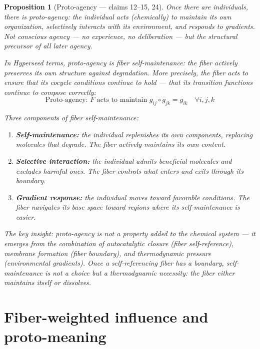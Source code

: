 \documentclass[11pt,a4paper]{article}
\newtheorem{proposition}[definition]{Proposition}
\begin{document}
\begin{proposition}[Proto-agency --- claims 12--15, 24]
\label{prop:maintenance}
Once there are individuals, there is proto-agency: the individual
acts (chemically) to maintain its own organization, selectively
interacts with its environment, and responds to gradients. Not
conscious agency --- no experience, no deliberation --- but the
structural precursor of all later agency.

In Hyperseed terms, proto-agency is \emph{fiber self-maintenance}:
the fiber actively preserves its own structure against degradation.
More precisely, the fiber acts to ensure that its cocycle conditions
continue to hold --- that its transition functions continue to compose
correctly:
\[
  \text{Proto-agency: } F \text{ acts to maintain }
  g_{ij} \circ g_{jk} = g_{ik} \quad \forall i,j,k
\]

Three components of fiber self-maintenance:
\begin{enumerate}
\item \textbf{Self-maintenance:} the individual replenishes its own
  components, replacing molecules that degrade. The fiber actively
  maintains its own content.
\item \textbf{Selective interaction:} the individual admits beneficial
  molecules and excludes harmful ones. The fiber controls what
  enters and exits through its boundary.
\item \textbf{Gradient response:} the individual moves toward
  favorable conditions. The fiber navigates its base space toward
  regions where its self-maintenance is easier.
\end{enumerate}

The key insight: proto-agency is not a property \emph{added} to the
chemical system --- it \emph{emerges} from the combination of
autocatalytic closure (fiber self-reference), membrane formation
(fiber boundary), and thermodynamic pressure (environmental gradients).
Once a self-referencing fiber has a boundary, self-maintenance is
not a choice but a thermodynamic necessity: the fiber either maintains
itself or dissolves.
\end{proposition}

\section{Fiber-weighted influence and proto-meaning}
\label{sec:meaning}
\end{document}
